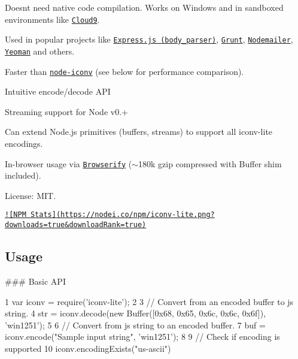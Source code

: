 
\begin{DoxyItemize}
\item Doesn\textquotesingle{}t need native code compilation. Works on Windows and in sandboxed environments like \href{http://c9.io}{\tt Cloud9}.
\item Used in popular projects like \href{https://github.com/expressjs/body-parser}{\tt Express.\+js (body\+\_\+parser)}, \href{http://gruntjs.com/}{\tt Grunt}, \href{http://www.nodemailer.com/}{\tt Nodemailer}, \href{http://yeoman.io/}{\tt Yeoman} and others.
\item Faster than \href{https://github.com/bnoordhuis/node-iconv}{\tt node-\/iconv} (see below for performance comparison).
\item Intuitive encode/decode A\+P\+I
\item Streaming support for Node v0.+
\item Can extend Node.\+js primitives (buffers, streams) to support all iconv-\/lite encodings.
\item In-\/browser usage via \href{https://github.com/substack/node-browserify}{\tt Browserify} ($\sim$180k gzip compressed with Buffer shim included).
\item License\+: M\+I\+T.
\end{DoxyItemize}

\href{https://npmjs.org/packages/iconv-lite/}{\tt !\mbox{[}N\+P\+M Stats\mbox{]}(https\+://nodei.\+co/npm/iconv-\/lite.\+png?downloads=true\&download\+Rank=true)}

\subsection*{Usage}

\#\#\# Basic A\+P\+I 
\begin{DoxyCode}
1 var iconv = require('iconv-lite');
2 
3 // Convert from an encoded buffer to js string.
4 str = iconv.decode(new Buffer([0x68, 0x65, 0x6c, 0x6c, 0x6f]), 'win1251');
5 
6 // Convert from js string to an encoded buffer.
7 buf = iconv.encode("Sample input string", 'win1251');
8 
9 // Check if encoding is supported
10 iconv.encodingExists("us-ascii")
\end{DoxyCode}


